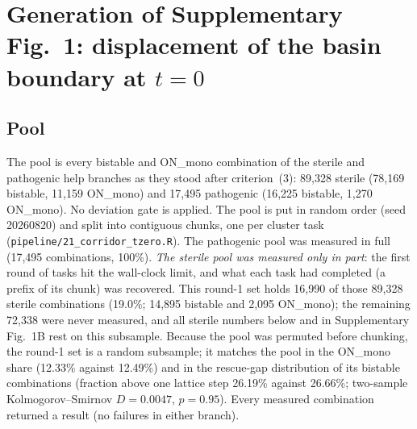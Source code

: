 \documentclass[11pt]{article}
\begin{document}
\section{\texorpdfstring{Generation of Supplementary Fig.~1: displacement of the basin boundary at $t=0$}{Generation of Supplementary Fig. 1: displacement of the basin boundary at t = 0}}
\label{sec:fig5}

\subsection{Pool}

The pool is every bistable and ON\_mono combination of the sterile and pathogenic help
branches as they stood after criterion~(3): 89{,}328 sterile (78{,}169 bistable, 11{,}159
ON\_mono) and 17{,}495 pathogenic
(16{,}225 bistable, 1{,}270 ON\_mono). No deviation gate is applied. The pool is put in random
order (seed 20260820) and split into contiguous chunks, one per cluster task
(\texttt{pipeline/21\_corridor\_tzero.R}). The pathogenic pool was measured in full (17{,}495
combinations, 100\%). \emph{The sterile pool was measured only in part}: the first round of
tasks hit the wall-clock limit, and what each task had completed (a prefix of its chunk) was
recovered. This round-1 set holds 16{,}990 of those 89{,}328 sterile combinations (19.0\%;
14{,}895 bistable and 2{,}095 ON\_mono); the remaining 72{,}338 were never measured, and all
sterile numbers below and in Supplementary Fig.~1B rest on this subsample. Because the pool was permuted
before chunking, the round-1 set is a random subsample; it matches the pool in the ON\_mono
share (12.33\% against 12.49\%) and in the rescue-gap distribution of its bistable
combinations (fraction above one lattice step 26.19\% against 26.66\%; two-sample
Kolmogorov--Smirnov $D = 0.0047$, $p = 0.95$). Every measured combination returned a result
(no failures in either branch).
\end{document}
